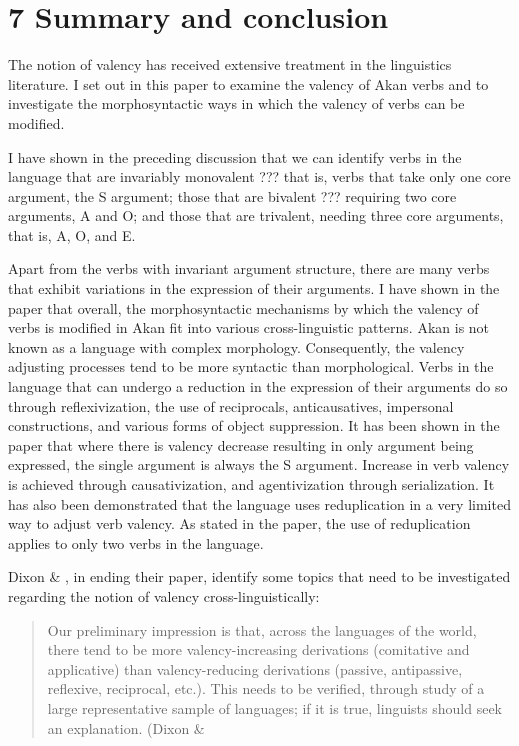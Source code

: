 \documentclass[output=paper]{langsci/langscibook}
\begin{document}
\section[7  Summary and conclusion]{7  Summary and conclusion}

The notion of valency has received extensive treatment in the linguistics literature. I set out in this paper to examine the valency of Akan verbs and to investigate the morphosyntactic ways in which the valency of verbs can be modified. 

I have shown in the preceding discussion that we can identify verbs in the language that are invariably monovalent ??? that is, verbs that take only one core argument, the S argument; those that are bivalent ??? requiring two core arguments, A and O; and those that are trivalent, needing three core arguments, that is, A, O, and E.

Apart from the verbs with invariant argument structure, there are many verbs that exhibit variations in the expression of their arguments. I have shown in the paper that overall, the morphosyntactic mechanisms by which the valency of verbs is modified in Akan fit into various cross-linguistic patterns. Akan is not known as a language with complex morphology. Consequently, the valency adjusting processes tend to be more syntactic than morphological. Verbs in the language that can undergo a reduction in the expression of their arguments do so through reflexivization, the use of reciprocals, anticausatives, impersonal constructions, and various forms of object suppression. It has been shown in the paper that where there is valency decrease resulting in only argument being expressed, the single argument is always the S argument.  Increase in verb valency is achieved through causativization, and agentivization through serialization. It has also been demonstrated that the language uses reduplication in a very limited way to adjust verb valency. As stated in the paper, the use of reduplication applies to only two verbs in the language.

Dixon \& \citet[25-27]{Aikhenvald2000b}, in ending their paper, identify some topics that need to be investigated regarding the notion of valency cross-linguistically:

\begin{quote}
Our preliminary impression is that, across the languages of the world, there tend to be more valency-increasing derivations (comitative and applicative) than valency-reducing derivations (passive, antipassive, reflexive, reciprocal, etc.). This needs to be verified, through study of a large representative sample of languages; if it is true, linguists should seek an explanation. (Dixon \& \citet[26]{Aikhenvald2000b}  
\end{quote}
\end{document}
